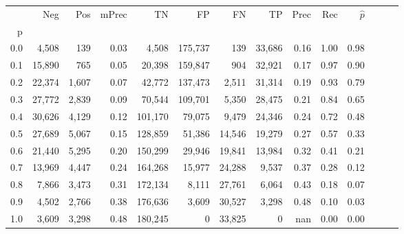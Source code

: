 \begin{tabular}{rrrrrrrrrrrrrr}
\toprule
{} &     Neg &    Pos & mPrec &       TN &       FP &      FN &      TP &  Prec &   Rec & $\hat{p}$ \\
p   &         &        &       &          &          &         &         &       &       &           \\
\midrule
0.0 &   4,508 &    139 &  0.03 &    4,508 &  175,737 &     139 &  33,686 &  0.16 &  1.00 &      0.98 \\
0.1 &  15,890 &    765 &  0.05 &   20,398 &  159,847 &     904 &  32,921 &  0.17 &  0.97 &      0.90 \\
0.2 &  22,374 &  1,607 &  0.07 &   42,772 &  137,473 &   2,511 &  31,314 &  0.19 &  0.93 &      0.79 \\
0.3 &  27,772 &  2,839 &  0.09 &   70,544 &  109,701 &   5,350 &  28,475 &  0.21 &  0.84 &      0.65 \\
0.4 &  30,626 &  4,129 &  0.12 &  101,170 &   79,075 &   9,479 &  24,346 &  0.24 &  0.72 &      0.48 \\
0.5 &  27,689 &  5,067 &  0.15 &  128,859 &   51,386 &  14,546 &  19,279 &  0.27 &  0.57 &      0.33 \\
0.6 &  21,440 &  5,295 &  0.20 &  150,299 &   29,946 &  19,841 &  13,984 &  0.32 &  0.41 &      0.21 \\
0.7 &  13,969 &  4,447 &  0.24 &  164,268 &   15,977 &  24,288 &   9,537 &  0.37 &  0.28 &      0.12 \\
0.8 &   7,866 &  3,473 &  0.31 &  172,134 &    8,111 &  27,761 &   6,064 &  0.43 &  0.18 &      0.07 \\
0.9 &   4,502 &  2,766 &  0.38 &  176,636 &    3,609 &  30,527 &   3,298 &  0.48 &  0.10 &      0.03 \\
1.0 &   3,609 &  3,298 &  0.48 &  180,245 &        0 &  33,825 &       0 &   nan &  0.00 &      0.00 \\
\bottomrule
\end{tabular}
